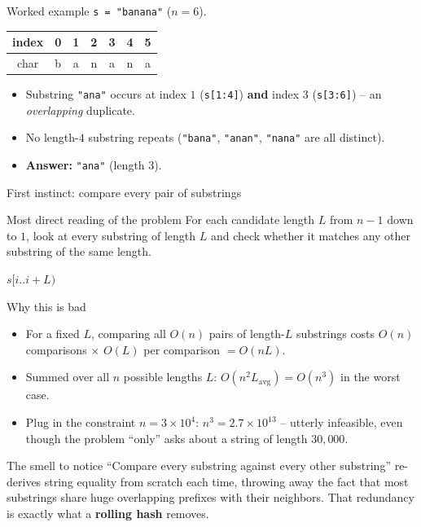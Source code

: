 \documentclass[11pt,aspectratio=169]{beamer}
\begin{document}
\begin{frame}{Worked example}
  \small
  \texttt{s = "banana"} ($n=6$).
  \begin{center}
  \begin{tabular}{@{}c|cccccc@{}}
    index & 0 & 1 & 2 & 3 & 4 & 5 \\
    \midrule
    char & b & a & n & a & n & a \\
  \end{tabular}
  \end{center}
  \begin{itemize}
    \item Substring \texttt{"ana"} occurs at index $1$ (\texttt{s[1:4]}) \textbf{and}
    index $3$ (\texttt{s[3:6]}) -- an \emph{overlapping} duplicate.
    \item No length-$4$ substring repeats (\texttt{"bana"}, \texttt{"anan"},
    \texttt{"nana"} are all distinct).
    \item \textbf{Answer:} \texttt{"ana"} (length $3$).
  \end{itemize}
\end{frame}

\begin{frame}{First instinct: compare every pair of substrings}
  \begin{block}{Most direct reading of the problem}
    For each candidate length $L$ from $n-1$ down to $1$, look at every substring of
    length $L$ and check whether it matches any other substring of the same length.
  \end{block}
  \begin{algorithmic}[1]
        \If{$s[i..i{+}L) = s[j..j{+}L)$} \Return $s[i..i{+}L)$ \EndIf
      \EndFor
    \EndFor
  \end{algorithmic}
\end{frame}

\begin{frame}{Why this is bad}
  \begin{itemize}
    \item For a fixed $L$, comparing all $O(n)$ pairs of length-$L$ substrings costs
    $O(n)$ comparisons $\times$ $O(L)$ per comparison $= O(nL)$.
    \item Summed over all $n$ possible lengths $L$: $O(n^2 L_{\text{avg}}) = O(n^3)$
    in the worst case.
    \item Plug in the constraint $n = 3\times10^4$: $n^3 = 2.7\times10^{13}$ -- utterly
    infeasible, even though the problem ``only'' asks about a string of length
    $30{,}000$.
  \end{itemize}
  \begin{alertblock}{The smell to notice}
    ``Compare every substring against every other substring'' re-derives string
    equality from scratch each time, throwing away the fact that most substrings share
    huge overlapping prefixes with their neighbors. That redundancy is exactly what a
    \textbf{rolling hash} removes.
  \end{alertblock}
\end{frame}
\end{document}

